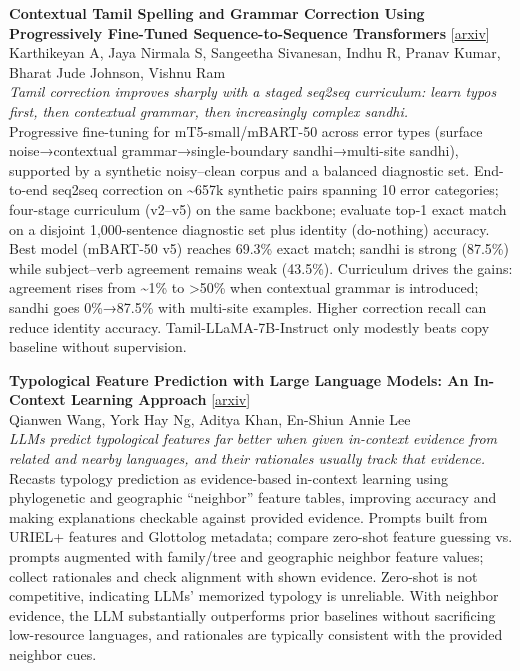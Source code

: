 \documentclass[12pt,letterpaper]{article}
\begin{document}
\medskip

{\small\textbf{Contextual Tamil Spelling and Grammar Correction Using Progressively Fine-Tuned Sequence-to-Sequence Transformers}} {\scriptsize[\href{https://arxiv.org/abs/2609.03273}{arxiv}]}\\
{\scriptsize Karthikeyan A, Jaya Nirmala S, Sangeetha Sivanesan, Indhu R, Pranav Kumar, Bharat Jude Johnson, Vishnu Ram}\\

{\small\textit{Tamil correction improves sharply with a staged seq2seq curriculum: learn typos first, then contextual grammar, then increasingly complex sandhi.}}\\[1pt]
{\footnotesize Progressive fine-tuning for mT5-small/mBART-50 across error types (surface noise→contextual grammar→single-boundary sandhi→multi-site sandhi), supported by a synthetic noisy--clean corpus and a balanced diagnostic set. End-to-end seq2seq correction on \textasciitilde{}657k synthetic pairs spanning 10 error categories; four-stage curriculum (v2--v5) on the same backbone; evaluate top-1 exact match on a disjoint 1,000-sentence diagnostic set plus identity (do-nothing) accuracy. Best model (mBART-50 v5) reaches 69.3\% exact match; sandhi is strong (87.5\%) while subject--verb agreement remains weak (43.5\%). Curriculum drives the gains: agreement rises from \textasciitilde{}1\% to >50\% when contextual grammar is introduced; sandhi goes 0\%→87.5\% with multi-site examples. Higher correction recall can reduce identity accuracy. Tamil-LLaMA-7B-Instruct only modestly beats copy baseline without supervision.}

\medskip

{\small\textbf{Typological Feature Prediction with Large Language Models: An In-Context Learning Approach}} {\scriptsize[\href{https://arxiv.org/abs/2609.03775}{arxiv}]}\\
{\scriptsize Qianwen Wang, York Hay Ng, Aditya Khan, En-Shiun Annie Lee}\\

{\small\textit{LLMs predict typological features far better when given in-context evidence from related and nearby languages, and their rationales usually track that evidence.}}\\[1pt]
{\footnotesize Recasts typology prediction as evidence-based in-context learning using phylogenetic and geographic ``neighbor'' feature tables, improving accuracy and making explanations checkable against provided evidence. Prompts built from URIEL+ features and Glottolog metadata; compare zero-shot feature guessing vs. prompts augmented with family/tree and geographic neighbor feature values; collect rationales and check alignment with shown evidence. Zero-shot is not competitive, indicating LLMs' memorized typology is unreliable. With neighbor evidence, the LLM substantially outperforms prior baselines without sacrificing low-resource languages, and rationales are typically consistent with the provided neighbor cues.}
\end{document}

